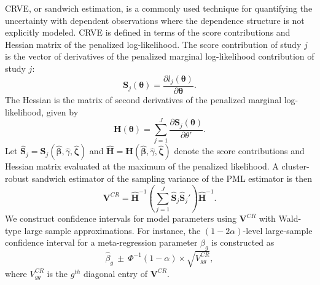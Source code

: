 \documentclass[
  american,
  man, donotrepeattitle,floatsintext]{apa7}
\begin{document}
CRVE, or sandwich estimation, is a commonly used technique for quantifying the uncertainty with dependent observations where the dependence structure is not explicitly modeled.
CRVE is defined in terms of the score contributions and Hessian matrix of the penalized log-likelihood.
The score contribution of study \(j\) is the vector of derivatives of the penalized marginal log-likelihood contribution of study \(j\):
\begin{equation}
\label{eq:score-contribution}
\mathbf{S}_{j}\left(\boldsymbol\theta\right) = \frac{\partial l_{j}\left(\boldsymbol\theta \right)}{\partial \boldsymbol\theta}.
\end{equation}
The Hessian is the matrix of second derivatives of the penalized marginal log-likelihood, given by
\begin{equation}
\mathbf{H}(\boldsymbol\theta) = \sum_{j=1}^J \frac{\partial \mathbf{S}_j(\boldsymbol\theta)}{\partial \theta'}.
\end{equation}
Let \(\mathbf{\hat{S}}_j = \mathbf{S}_j(\boldsymbol{\hat\beta}, \hat\gamma, \boldsymbol{\hat\zeta})\) and \(\mathbf{\hat{H}} = \mathbf{H}(\boldsymbol{\hat\beta}, \hat\gamma, \boldsymbol{\hat\zeta})\) denote the score contributions and Hessian matrix evaluated at the maximum of the penalized likelihood.
A cluster-robust sandwich estimator of the sampling variance of the PML estimator is then
\begin{equation}
\label{eq:sandwich-variance}
\mathbf{V}^{CR} = \mathbf{\hat{H}}^{-1}\left(\sum_{j=1}^J \mathbf{\hat{S}}_j {\mathbf{\hat{S}}_j}'\right) \mathbf{\hat{H}}^{-1}.
\end{equation}
We construct confidence intervals for model parameters using \(\mathbf{V}^{CR}\) with Wald-type large sample approximations. For instance, the \((1 - 2\alpha)\)-level large-sample confidence interval for a meta-regression parameter \(\beta_g\) is constructed as
\[
\hat\beta_g \ \pm \ \Phi^{-1}(1 - \alpha) \times \sqrt{V^{CR}_{gg}},
\]
where \(V^{CR}_{gg}\) is the \(g^{th}\) diagonal entry of \(\mathbf{V}^{CR}\).
\end{document}
